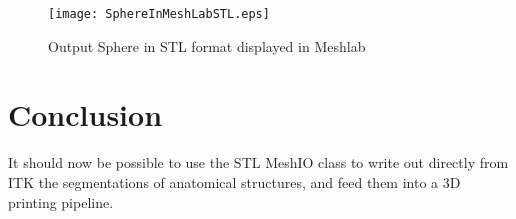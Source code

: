 \documentclass{InsightArticle}
\begin{document}
\begin{figure}[!htb]
\centering
\texttt{[image: SphereInMeshLabSTL.eps]}
\caption{Output Sphere in STL format displayed in Meshlab}
\end{figure}

\clearpage

\section{Conclusion}

It should now be possible to use the STL MeshIO class to write out directly
from ITK the segmentations of anatomical structures, and feed them into a 3D
printing pipeline.



%
%



\end{document}
